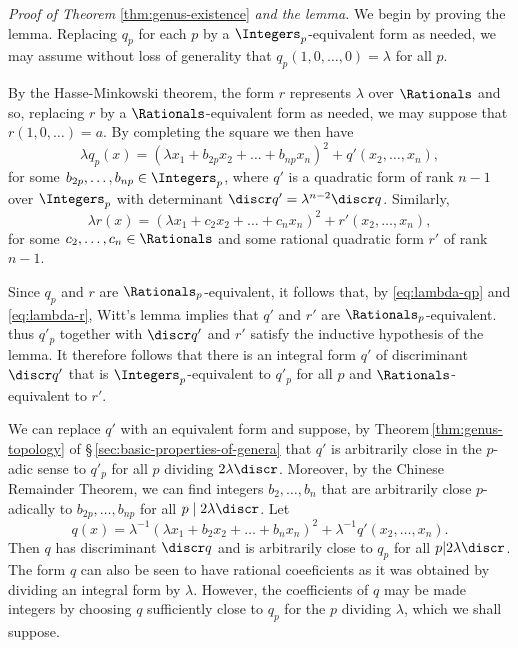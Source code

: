 \emph{Proof of Theorem} \ref{thm:genus-existence} \emph{and the lemma.} We begin
by proving the lemma. Replacing \(q_p\) for each \(p\) by a
\(\Integers_p\)-equivalent form as needed, we may assume without loss of
generality that \(q_p(1, 0, \dots, 0) = \lambda\) for all \(p\).

By the Hasse-Minkowski theorem, the form \(r\) represents \(\lambda\) over
\(\Rationals\) and so, replacing \(r\) by a \(\Rationals\)-equivalent form as
needed, we may suppose that \(r(1 ,0, \dots) = a\). By completing the square we
then have
\begin{equation}\label{eq:lambda-qp}
    \lambda q_p(x) = (\lambda x_1 + b_{2p}x_2 + \dots + b_{np}x_n)^2 + q'(x_2, \dots, x_n),  
\end{equation}
for some \(b_{2p}, \dots, b_{np} \in \Integers_p\), where \(q'\) is a quadratic
form of rank \(n-1\) over \(\Integers_p\) with determinant \(\discr q' =
\lambda^{n-2} \discr q\). Similarly,
\begin{equation}\label{eq:lambda-r}
    \lambda r(x) = (\lambda x_1 + c_2x_2 + \dots + c_nx_n)^2 + r'(x_2, \dots, x_n),
\end{equation}
for some \(c_2, \dots, c_n \in \Rationals\) and some rational quadratic form
\(r'\) of rank \(n-1\).

Since \(q_p\) and \(r\) are \(\Rationals_p\)-equivalent, it follows that, by
\eqref{eq:lambda-qp} and \eqref{eq:lambda-r}, Witt's lemma implies that \(q'\)
and \(r'\) are \(\Rationals_p\)-equivalent. thus \(q'_p\) together with \(\discr
q'\) and \(r'\) satisfy the inductive hypothesis of the lemma. It therefore
follows that there is an integral form \(q'\) of discriminant \(\discr q'\) that
is \(\Integers_p\)-equivalent to \(q'_p\) for all \(p\) and
\(\Rationals\)-equivalent to \(r'\).

We can replace \(q'\) with an equivalent form and suppose, by
Theorem\,\ref{thm:genus-topology} of \S\,\ref{sec:basic-properties-of-genera}
that \(q'\) is arbitrarily close in the \(p\)-adic sense to \(q'_p\) for all
\(p\) dividing \(2 \lambda\discr\). Moreover, by the Chinese Remainder Theorem,
we can find integers  \(b_2, \dots, b_n\) that are arbitrarily close
\(p\)-adically to \(b_{2p}, \dots, b_{np}\) for all \(p \mid 2 \lambda \discr\).
Let
\begin{equation}\label{eq:q-definition-lemma}
    q(x) = \lambda^{-1}(\lambda x_1 + b_2x_2 + \dots + b_nx_n)^2 + \lambda^{-1}q'(x_2, \dots, x_n).
\end{equation}
Then \(q\) has discriminant \(\discr q\) and is arbitrarily close to \(q_p\) for
all \(p | 2\lambda\discr\). The form \(q\) can also be seen to have rational
coeeficients as it was obtained by dividing an integral form by \(\lambda\).
However, the coefficients of \(q\) may be made integers by choosing \(q\)
sufficiently close to \(q_p\) for the \(p\) dividing \(\lambda\), which we shall
suppose.

